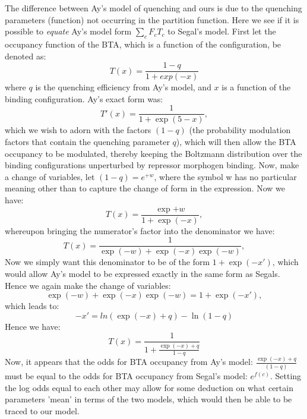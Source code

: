 The difference between Ay's model of quenching and ours is due to the quenching parameters (function) not occurring in the partition function.  Here we see if it is possible to \emph{equate} Ay's model form $\sum_c F_c T_c$ to Segal's model.  First let the occupancy function of the BTA, which is a function of the configuration, be denoted as:
 \begin{equation}
 T(x)=\frac{1-q}{1+exp{(-x)}}
 \end{equation}
 where $q$ is the quenching efficiency from Ay's model, and $x$ is a function of the binding configuration.  Ay's exact form was:
 \begin{equation}
 T'(x)=\frac{1}{1+\exp{(5-x)}},
 \end{equation} 
which we wish to adorn with the factors $(1-q)$ (the probability modulation factors that contain the quenching parameter $q$), which will then allow the BTA occupancy to be modulated, thereby keeping the Boltzmann distribution over the binding configurations unperturbed by repressor morphogen binding.  Now, make a change of variables, let $(1-q)=e^{+w}$, where the symbol w has no particular meaning other than to capture the change of form in the expression.  Now we have:
\begin{equation}
 T(x)=\frac{\exp{+w}}{1+\exp{(-x)}},
 \end{equation}
 whereupon bringing the numerator's factor into the denominator we have:
 \begin{equation}
 T(x)=\frac{1}{\exp{(-w)}+\exp{(-x)}\exp{(-w)}},
 \end{equation}
Now we simply want this denominator to be of the form $1+\exp{(-x')}$, which would allow Ay's model to be expressed exactly in the same form as Segals.  Hence we again make the change of variables:
\begin{equation}
 \exp{(-w)}+\exp{(-x)}\exp{(-w)}=1+\exp{(-x')},
 \end{equation} 
 which leads to:
 \begin{equation}
 -x' = ln(\exp{(-x)} +q ) - \ln{(1-q)} 
 \end{equation}
 Hence we have:
 \begin{equation}
 T(x) = \frac{1}{1+ \frac{\exp{(-x)}+q}{1-q}}
 \end{equation}
 Now, it appears that the odds for BTA occupancy from Ay's model: $\frac{\exp{(-x)}+q}{(1-q)}$ must be equal to the odds for BTA occupancy from Segal's model: $e^{f(c)}$.  Setting the log odds equal to each other may allow for some deduction on what certain parameters 'mean' in terms of the two models, which would then be able to be traced to our model.
